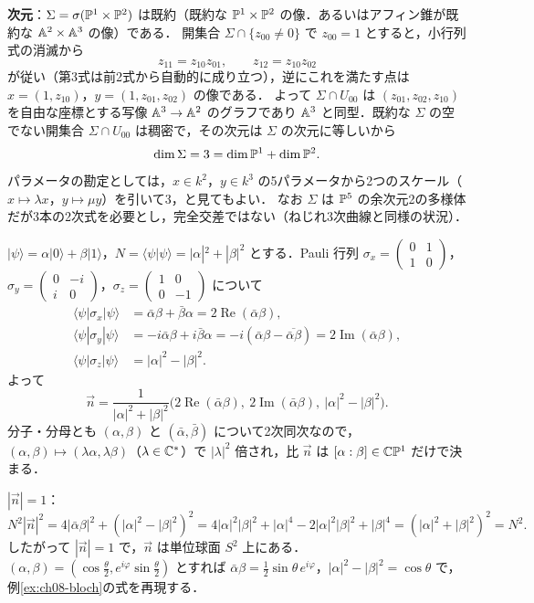 \textbf{次元}：$\Sigma=\sigma(\mathbb{P}^1\times\mathbb{P}^2)$ は既約（既約な $\mathbb{P}^1\times\mathbb{P}^2$ の像．あるいはアフィン錐が既約な $\mathbb{A}^2\times\mathbb{A}^3$ の像）である．
開集合 $\Sigma\cap\{z_{00}\neq0\}$ で $z_{00}=1$ とすると，小行列式の消滅から
\[
  z_{11}=z_{10}z_{01},\qquad z_{12}=z_{10}z_{02}
\]
が従い（第3式は前2式から自動的に成り立つ），逆にこれを満たす点は $x=(1,z_{10})$，$y=(1,z_{01},z_{02})$ の像である．
よって $\Sigma\cap U_{00}$ は $(z_{01},z_{02},z_{10})$ を自由な座標とする写像 $\mathbb{A}^3\to\mathbb{A}^2$ のグラフであり $\mathbb{A}^3$ と同型．既約な $\Sigma$ の空でない開集合 $\Sigma\cap U_{00}$ は稠密で，その次元は $\Sigma$ の次元に等しいから
\[
  \dim\Sigma=3=\dim\mathbb{P}^1+\dim\mathbb{P}^2.
\]
パラメータの勘定としては，$x\in k^2$，$y\in k^3$ の5パラメータから2つのスケール（$x\mapsto\lambda x$，$y\mapsto\mu y$）を引いて3，と見てもよい．
なお $\Sigma$ は $\mathbb{P}^5$ の余次元2の多様体だが3本の2次式を必要とし，完全交差ではない（ねじれ3次曲線と同様の状況）．

$|\psi\rangle=\alpha|0\rangle+\beta|1\rangle$，$N=\langle\psi|\psi\rangle=|\alpha|^2+|\beta|^2$ とする．Pauli 行列
$\sigma_x=\begin{pmatrix}0&1\\1&0\end{pmatrix}$，$\sigma_y=\begin{pmatrix}0&-i\\i&0\end{pmatrix}$，$\sigma_z=\begin{pmatrix}1&0\\0&-1\end{pmatrix}$ について
\begin{align*}
  \langle\psi|\sigma_x|\psi\rangle&=\bar\alpha\beta+\bar\beta\alpha=2\operatorname{Re}(\bar\alpha\beta),\\
  \langle\psi|\sigma_y|\psi\rangle&=-i\bar\alpha\beta+i\bar\beta\alpha=-i(\bar\alpha\beta-\overline{\bar\alpha\beta})=2\operatorname{Im}(\bar\alpha\beta),\\
  \langle\psi|\sigma_z|\psi\rangle&=|\alpha|^2-|\beta|^2.
\end{align*}
よって
\[
  \vec n=\frac{1}{|\alpha|^2+|\beta|^2}\bigl(2\operatorname{Re}(\bar\alpha\beta),\ 2\operatorname{Im}(\bar\alpha\beta),\ |\alpha|^2-|\beta|^2\bigr).
\]
分子・分母とも $(\alpha,\beta)$ と $(\bar\alpha,\bar\beta)$ について2次同次なので，$(\alpha,\beta)\mapsto(\lambda\alpha,\lambda\beta)$（$\lambda\in\mathbb{C}^*$）で $|\lambda|^2$ 倍され，比 $\vec n$ は $[\alpha:\beta]\in\mathbb{C}\mathbb{P}^1$ だけで決まる．

\textbf{$|\vec n|=1$}：
\[
  N^2|\vec n|^2=4|\bar\alpha\beta|^2+(|\alpha|^2-|\beta|^2)^2=4|\alpha|^2|\beta|^2+|\alpha|^4-2|\alpha|^2|\beta|^2+|\beta|^4=(|\alpha|^2+|\beta|^2)^2=N^2.
\]
したがって $|\vec n|=1$ で，$\vec n$ は単位球面 $S^2$ 上にある．$(\alpha,\beta)=(\cos\frac\theta2,e^{i\varphi}\sin\frac\theta2)$ とすれば $\bar\alpha\beta=\frac12\sin\theta\,e^{i\varphi}$，$|\alpha|^2-|\beta|^2=\cos\theta$ で，例\ref{ex:ch08-bloch}の式を再現する．

